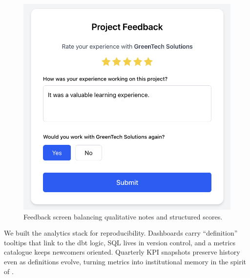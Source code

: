 \begin{figure}[H]
  \centering
  \includegraphics[width=0.8\linewidth]{figures/Student-Project-Feedback.png}
  \caption{Feedback screen balancing qualitative notes and structured scores.}
  \label{fig:feedback-screen}
\end{figure}

We built the analytics stack for reproducibility. Dashboards carry ``definition'' tooltips that link to the dbt logic, SQL lives in version control, and a metrics catalogue keeps newcomers oriented. Quarterly KPI snapshots preserve history even as definitions evolve, turning metrics into institutional memory in the spirit of \citet{Choudary2016}.
